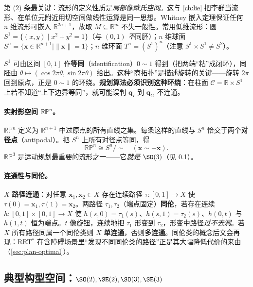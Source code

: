 \noindent 第 (2) 条最关键：流形的定义性质是\emph{局部像欧氏空间}。这与 \cref{ch:lie} 把李群当流形、在单位元附近用切空间做线性运算是同一思想。Whitney 嵌入定理保证任何 $n$ 维流形可嵌入 $\mathbb{R}^{2n+1}$，故取 $M\subseteq\mathbb{R}^m$ 不失一般性。常用低维流形：圆 $S^1=\{(x,y)\mid x^2+y^2=1\}$（与 $(0,1)$ \emph{不}同胚）；$n$ 维球面 $S^n=\{\mathbf{x}\in\mathbb{R}^{n+1}\mid\|\mathbf{x}\|=1\}$；$n$ 维环面 $T^n=(S^1)^n$（注意 $S^1\times S^1\ne S^2$）。

\begin{insight}
$S^1$ 可由区间 $[0,1]$ 作\textbf{等同}（identification）$0\sim1$ 得到（把两端“粘”成闭环），同胚由 $\theta\mapsto(\cos2\pi\theta,\sin2\pi\theta)$ 给出。这种“商拓扑”是描述旋转的关键——旋转 $2\pi$ 回到原点，正是 $0\sim1$ 的环绕。\textbf{规划算法必须识别这种环绕}：在柱面 $\mathcal{C}=\mathbb{R}\times S^1$ 上若不知道“上下边界等同”，就可能误判 $\mathbf{q}_I$ 到 $\mathbf{q}_G$ 不连通。
\end{insight}

\paragraph{实射影空间 $\mathbb{RP}^n$。}
$\mathbb{RP}^n$ 定义为 $\mathbb{R}^{n+1}$ 中过原点的所有直线之集。每条这样的直线与 $S^n$ 恰交于两个\textbf{对径点}（antipodal）。把 $S^n$ 上所有对径点等同，得
\begin{equation}
  \mathbb{RP}^n\cong S^n/\!\sim\quad(\mathbf{x}\sim-\mathbf{x}).
  \label{eq:plan-rpn}
\end{equation}
$\mathbb{RP}^3$ 是运动规划最重要的流形之一——它\emph{就是} $\SO(3)$（见 \cref{sec:plan-so3}）。

\paragraph{连通性与同伦。}
$X$ \textbf{路径连通}：对任意 $\mathbf{x}_1,\mathbf{x}_2\in X$ 存在连续路径 $\tau:[0,1]\to X$ 使 $\tau(0)=\mathbf{x}_1,\tau(1)=\mathbf{x}_2$。两路径 $\tau_1,\tau_2$（端点固定）\textbf{同伦}，若存在连续 $h:[0,1]\times[0,1]\to X$ 使 $h(s,0)=\tau_1(s)$、$h(s,1)=\tau_2(s)$、$h(0,t)$ 与 $h(1,t)$ 恒为端点。$t$ 像旋钮，连续地把 $\tau_1$ 形变到 $\tau_2$，形变中路径\emph{过不去洞}。若 $X$ 所有路径同属一个同伦类则 $X$ \textbf{单连通}，否则\textbf{多连通}。同伦类的概念后文会再现：RRT$^*$ 在含障碍场景里“发现不同同伦类的路径”正是其大幅降低代价的来由（\cref{sec:plan-optimal}）。

\subsection{典型构型空间：$\SO(2),\SE(2),\SO(3),\SE(3)$}
\label{sec:plan-so3}

